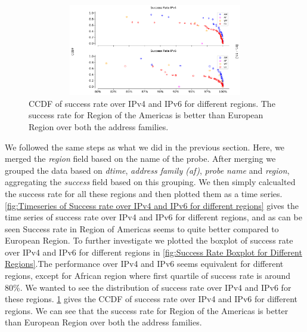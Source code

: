 \begin{figure}[!ht]
	\centering
	\includegraphics[keepaspectratio, height=4cm, width=15cm]{figures/success/netflix-success-rate-ccdf-region.pdf}
	\caption[Success Rate CCDF for Different Regions]{CCDF of success rate over IPv4 and IPv6 for different regions. The success rate for Region of the Americas is better than European Region over both the address families.}
	\label{fig:Success Rate CCDF for Different Regions}
\end{figure}
We followed the same steps as what we did in the previous section. Here, we merged the \textit{region} field based on the name of the probe. After merging we grouped the data based on \textit{dtime},
\textit{address family (af)}, \textit{probe name} and \textit{region}, aggregating the \textit{success} field based on this grouping. We then simply calcualted the success rate for all these regions
and then plotted them as a time series. \cref{fig:Timeseries of Success rate over IPv4 and IPv6 for different regions} gives the time series of success rate over IPv4 and IPv6 for different regions, and as can be seen Success rate in Region of Americas seems to quite better compared to European Region.
To further investigate we plotted the boxplot of success rate over IPv4 and IPv6 for different regions in \cref{fig:Success Rate Boxplot for Different Regions}.The performance over IPv4 and IPv6 seems equivalent for different regions, except for African region where first quartile of success rate is around 80\%.
We wanted to see the distribution of success rate over IPv4 and IPv6 for these regions. \cref{fig:Success Rate CCDF for Different Regions} gives the CCDF of success rate over IPv4 and IPv6 for different regions. We can see that the success rate for Region of the Americas is better than European Region over both the address families.
\FloatBarrier

